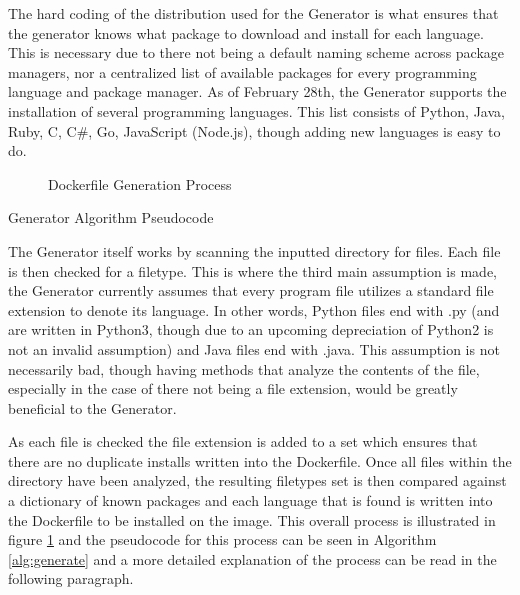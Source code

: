 The hard coding of the distribution used for the Generator is what ensures that the generator knows what package to download and install for each language. This is necessary due to there not being a default naming scheme across package managers, nor a centralized list of available packages for every programming language and package manager. As of February 28th, the Generator supports the installation of several programming languages. This list consists of Python, Java, Ruby, C, C\#, Go, JavaScript (Node.js), though adding new languages is easy to do.

\begin{figure}[h!]
  \centering
  
  \caption{Dockerfile Generation Process}
  \label{fig:generator}
\end{figure}

\begin{algorithm}[H]
  
  \caption{Generator Algorithm Pseudocode}
  \label{alg:generate}
\end{algorithm}

The Generator itself works by scanning the inputted directory for files. Each file is then checked for a filetype. This is where the third main assumption is made, the Generator currently assumes that every program file utilizes a standard file extension to denote its language. In other words, Python files end with .py (and are written in Python3, though due to an upcoming depreciation of Python2 is not an invalid assumption) and Java files end with .java. This assumption is not necessarily bad, though having methods that analyze the contents of the file, especially in the case of there not being a file extension, would be greatly beneficial to the Generator.

As each file is checked the file extension is added to a set which ensures that there are no duplicate installs written into the Dockerfile. Once all files within the directory have been analyzed, the resulting filetypes set is then compared against a dictionary of known packages and each language that is found is written into the Dockerfile to be installed on the image. This overall process is illustrated in figure \ref{fig:generator} and the pseudocode for this process can be seen in Algorithm \ref{alg:generate} and a more detailed explanation of the process can be read in the following paragraph.

